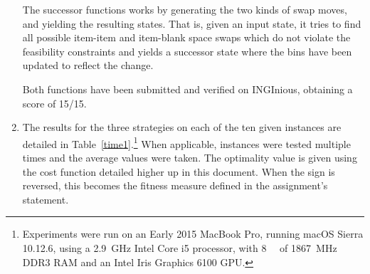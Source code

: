 \documentclass[journal,onecolumn]{IEEEtran}
\begin{document}
\begin{enumerate}
	The successor functions works by generating the two kinds of swap moves, and yielding the resulting states.
	That is, given an input state, it tries to find all possible item-item and item-blank space swaps which do not violate the feasibility constraints and yields a successor state where the bins have been updated to reflect the change.
	
	Both functions have been submitted and verified on INGInious, obtaining a score of 15/15.
	\item  The results for the three strategies on each of the ten given instances are detailed in Table~\ref{time1}.\footnote{Experiments were run on an Early 2015 MacBook Pro, running macOS Sierra 10.12.6, using a \SI{2.9}{\giga\hertz} Intel Core i5 processor, with \SI{8}{\giga\byte} of \SI{1867}{\mega\hertz} DDR3 RAM and an Intel Iris Graphics 6100 GPU.}
	When applicable, instances were tested multiple times and the average values were taken.
	The optimality value is given using the cost function detailed higher up in this document.
	When the sign is reversed, this becomes the fitness measure defined in the assignment's statement.
	

\end{enumerate}
\end{document}
